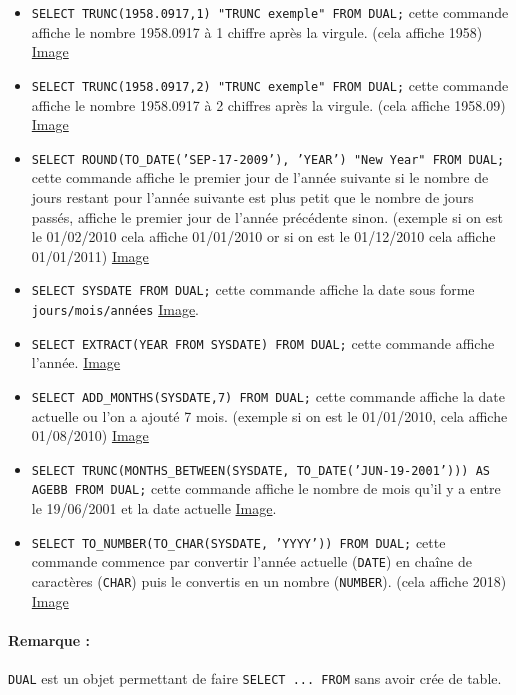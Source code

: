 \documentclass{report}
\begin{document}
\begin{itemize}
	\item {\tt SELECT TRUNC(1958.0917,1) "TRUNC exemple" FROM DUAL;} cette commande affiche le nombre 1958.0917 à 1 chiffre après la virgule. (cela affiche 1958) \href{run:./Images/TP3/tp3_fonction9.png}{Image}
	\item {\tt SELECT TRUNC(1958.0917,2) "TRUNC exemple" FROM DUAL;} cette commande affiche le nombre 1958.0917 à 2 chiffres après la virgule. (cela affiche 1958.09) \href{run:./Images/TP3/tp3_fonction10.png}{Image}
	\item {\tt SELECT ROUND(TO\_DATE('SEP-17-2009'), 'YEAR') "New Year" FROM DUAL;} cette commande affiche le premier jour de l'année suivante si le nombre de jours restant pour l'année suivante est plus petit que le nombre de jours passés, affiche le premier jour de l'année précédente sinon. (exemple si on est le 01/02/2010 cela affiche 01/01/2010 or si on est le 01/12/2010 cela affiche 01/01/2011) \href{run:./Images/TP3/tp3_fonction11.png}{Image}
	\item {\tt SELECT SYSDATE FROM DUAL;} cette commande affiche la date sous forme {\tt jours/mois/années} \href{run:./Images/TP3/tp3_fonction12.png}{Image}.
	\item {\tt SELECT EXTRACT(YEAR FROM SYSDATE) FROM DUAL;} cette commande affiche l'année. \href{run:./Images/TP3/tp3_fonction13.png}{Image}
	\item {\tt SELECT ADD\_MONTHS(SYSDATE,7) FROM DUAL;} cette commande affiche la date actuelle ou l'on a ajouté 7 mois. (exemple si on est le 01/01/2010, cela affiche 01/08/2010) \href{run:./Images/TP3/tp3_fonction14.png}{Image}
	\item {\tt SELECT TRUNC(MONTHS\_BETWEEN(SYSDATE, TO\_DATE('JUN-19-2001'))) AS AGEBB FROM DUAL;} cette commande affiche le nombre de mois qu'il y a entre le 19/06/2001 et la date actuelle \href{run:./Images/TP3/tp3_fonction15.png}{Image}.
	\item {\tt SELECT TO\_NUMBER(TO\_CHAR(SYSDATE, 'YYYY')) FROM DUAL;} cette commande commence par convertir l'année actuelle ({\tt DATE}) en chaîne de caractères ({\tt CHAR}) puis le convertis en un nombre ({\tt NUMBER}). (cela affiche 2018) \href{run:./Images/TP3/tp3_fonction16.png}{Image}
\end{itemize}

\paragraph{Remarque :}{\tt DUAL} est un objet permettant de faire {\tt SELECT ... FROM} sans avoir crée de table.
\end{document}
